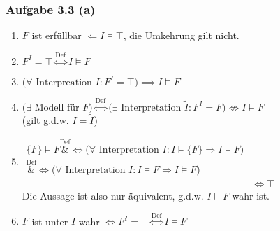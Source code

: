 \subsubsection{Aufgabe 3.3 (a)}
\begin{enumerate}[label=(\arabic*)]
	\item $F$ ist erfüllbar $\Longleftarrow I\models\top$, die Umkehrung gilt nicht.
	\item $F^I=\top\stackrel{\text{Def}}{\Longleftrightarrow} I\models F$
	\item $\big(\forall\text{ Interpreation }I:F^I=\top\big)\implies I\models F$
	\item $\Big(\exists\text{ Modell für }F \Big)
		\stackrel{\text{Def}}{\Longleftrightarrow}
		\Big(\exists\text{ Interpretation }\tilde{I}:F^{\tilde{I}}=F\big)\not\Longleftrightarrow I\models F$\\
		(gilt g.d.w. $I=\tilde{I}$)
	\item $\begin{aligned}
		\lbrace F\rbrace\models F
		\overset{\text{Def}}&{\Longleftrightarrow}
		\big(\forall\text{ Interpretation }I:I\models\lbrace F\rbrace\Rightarrow I\models F\big)\\
		\overset{\text{Def}}&{\Longleftrightarrow}
		\big(\forall\text{ Interpretation }I:I\models F\Rightarrow I\models F\big)\\
		&\Longleftrightarrow\top
	\end{aligned}$\\
	Die Aussage ist also nur äquivalent, g.d.w. $I\models F$ wahr ist.
	\item $F$ ist unter $I$ wahr $\Longleftrightarrow F^I=\top\stackrel{\text{Def}}{\Longleftrightarrow} I\models F$
\end{enumerate}

